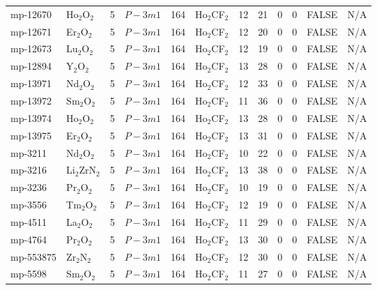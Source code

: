 {\begin{longtable}{llcccccccccc}
    mp-12670 & Ho$_{2}$O$_{2}$ & 5     & $P-3m1$ & 164   & Ho$_{2}$CF$_{2}$ & 12    & 21    & 0     & 0     & FALSE & N/A \\
    mp-12671 & Er$_{2}$O$_{2}$ & 5     & $P-3m1$ & 164   & Ho$_{2}$CF$_{2}$ & 12    & 20    & 0     & 0     & FALSE & N/A \\
    mp-12673 & Lu$_{2}$O$_{2}$ & 5     & $P-3m1$ & 164   & Ho$_{2}$CF$_{2}$ & 12    & 19    & 0     & 0     & FALSE & N/A \\
    mp-12894 & Y$_{2}$O$_{2}$ & 5     & $P-3m1$ & 164   & Ho$_{2}$CF$_{2}$ & 13    & 28    & 0     & 0     & FALSE & N/A \\
    mp-13971 & Nd$_{2}$O$_{2}$ & 5     & $P-3m1$ & 164   & Ho$_{2}$CF$_{2}$ & 12    & 33    & 0     & 0     & FALSE & N/A \\
    mp-13972 & Sm$_{2}$O$_{2}$ & 5     & $P-3m1$ & 164   & Ho$_{2}$CF$_{2}$ & 11    & 36    & 0     & 0     & FALSE & N/A \\
    mp-13974 & Ho$_{2}$O$_{2}$ & 5     & $P-3m1$ & 164   & Ho$_{2}$CF$_{2}$ & 13    & 28    & 0     & 0     & FALSE & N/A \\
    mp-13975 & Er$_{2}$O$_{2}$ & 5     & $P-3m1$ & 164   & Ho$_{2}$CF$_{2}$ & 13    & 31    & 0     & 0     & FALSE & N/A \\
    mp-3211 & Nd$_{2}$O$_{2}$ & 5     & $P-3m1$ & 164   & Ho$_{2}$CF$_{2}$ & 10    & 22    & 0     & 0     & FALSE & N/A \\
    mp-3216 & Li$_{2}$ZrN$_{2}$ & 5     & $P-3m1$ & 164   & Ho$_{2}$CF$_{2}$ & 13    & 38    & 0     & 0     & FALSE & N/A \\
    mp-3236 & Pr$_{2}$O$_{2}$ & 5     & $P-3m1$ & 164   & Ho$_{2}$CF$_{2}$ & 10    & 19    & 0     & 0     & FALSE & N/A \\
    mp-3556 & Tm$_{2}$O$_{2}$ & 5     & $P-3m1$ & 164   & Ho$_{2}$CF$_{2}$ & 12    & 19    & 0     & 0     & FALSE & N/A \\
    mp-4511 & La$_{2}$O$_{2}$ & 5     & $P-3m1$ & 164   & Ho$_{2}$CF$_{2}$ & 11    & 29    & 0     & 0     & FALSE & N/A \\
    mp-4764 & Pr$_{2}$O$_{2}$ & 5     & $P-3m1$ & 164   & Ho$_{2}$CF$_{2}$ & 13    & 30    & 0     & 0     & FALSE & N/A \\
    mp-553875 & Zr$_{2}$N$_{2}$ & 5     & $P-3m1$ & 164   & Ho$_{2}$CF$_{2}$ & 12    & 30    & 0     & 0     & FALSE & N/A \\
    mp-5598 & Sm$_{2}$O$_{2}$ & 5     & $P-3m1$ & 164   & Ho$_{2}$CF$_{2}$ & 11    & 27    & 0     & 0     & FALSE & N/A \\

\end{longtable}}
